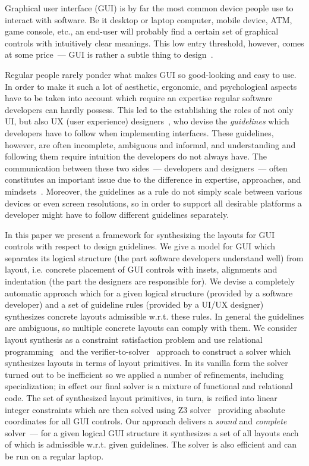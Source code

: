 
Graphical user interface (GUI) is by far the most common device people use to interact with software. Be it desktop
or laptop computer, mobile device, ATM, game console, etc., an end-user will probably find a certain set
of graphical controls with intuitively clear meanings. This low entry threshold, however, comes at some
price~--- GUI is rather a subtle thing to design~\cite{UI1}.

Regular people rarely ponder what makes GUI so good-looking and easy to use. In order to make it such a lot of
aesthetic, ergonomic, and psychological aspects have to be taken into account which require an expertise
regular software developers can hardly possess. This led to the establishing the roles of not only UI, but also UX
(user experience) designers~\cite{UI5}, who devise the \emph{guidelines} which developers have to
follow when implementing interfaces. These guidelines, however, are often incomplete, ambiguous and informal, and understanding
and following them require intuition the developers do not always have.  The communication between these two
sides~--- developers and designers~---  often constitutes an important issue due to the difference in
expertise, approaches, and mindsets~\cite{UI6}. Moreover, the guidelines as a rule
do not simply scale between various devices or even screen resolutions, so in order to support all desirable
platforms a developer might have to follow different guidelines separately.

In this paper we present a framework for synthesizing the layouts for GUI controls with respect to design guidelines. We give a model for GUI
which separates its logical structure (the part software developers understand well) from layout, i.e. concrete placement
of GUI controls with insets, alignments and indentation (the part the designers are responsible for). We devise a completely automatic approach
which for a given logical structure (provided by a software developer) and a set of guideline rules (provided by a UI/UX designer) synthesizes
concrete layouts admissible w.r.t. these rules. In general the guidelines are ambiguous, so multiple concrete layouts can
comply with them. We consider layout synthesis as a constraint satisfaction problem and use relational programming~\cite{TRS}
and the verifier-to-solver~\cite{searchproblems} approach to construct a solver which synthesizes layouts in terms of layout primitives. In its
vanilla form the solver turned out to be inefficient so we applied a number of refinements, including specialization; in effect our
final solver is a mixture of functional and relational code. The set of synthesized layout primitives, in turn, is reified into linear
integer constraints which are then solved using \textsc{Z3} solver~\cite{Zthree} providing absolute coordinates for all GUI controls.
Our approach delivers a \emph{sound} and \emph{complete} solver~--- for a given logical GUI structure it synthesizes a set of all layouts each of which is
admissible w.r.t. given guidelines. The solver is also efficient and can be run on a regular laptop.

